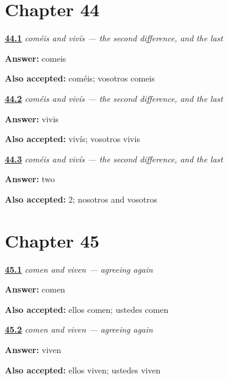 \section*{Chapter 44}

\noindent\begin{minipage}[t]{\linewidth}
\raggedright
\hyperlink{review-ES-C07-comeis-vivis-eat}{\textbf{44.1}} \emph{coméis and vivís — the second difference, and the last}\par
\small \textbf{Answer:} comeis\par
\footnotesize \textbf{Also accepted:} coméis; vosotros comeis
\end{minipage}\par\medskip

\noindent\begin{minipage}[t]{\linewidth}
\raggedright
\hyperlink{review-ES-C07-comeis-vivis-live}{\textbf{44.2}} \emph{coméis and vivís — the second difference, and the last}\par
\small \textbf{Answer:} vivis\par
\footnotesize \textbf{Also accepted:} vivís; vosotros vivis
\end{minipage}\par\medskip

\noindent\begin{minipage}[t]{\linewidth}
\raggedright
\hyperlink{review-ES-C07-comeis-vivis-count}{\textbf{44.3}} \emph{coméis and vivís — the second difference, and the last}\par
\small \textbf{Answer:} two\par
\footnotesize \textbf{Also accepted:} 2; nosotros and vosotros
\end{minipage}\par\medskip

\section*{Chapter 45}

\noindent\begin{minipage}[t]{\linewidth}
\raggedright
\hyperlink{review-ES-C07-comen-viven-eat}{\textbf{45.1}} \emph{comen and viven — agreeing again}\par
\small \textbf{Answer:} comen\par
\footnotesize \textbf{Also accepted:} ellos comen; ustedes comen
\end{minipage}\par\medskip

\noindent\begin{minipage}[t]{\linewidth}
\raggedright
\hyperlink{review-ES-C07-comen-viven-live}{\textbf{45.2}} \emph{comen and viven — agreeing again}\par
\small \textbf{Answer:} viven\par
\footnotesize \textbf{Also accepted:} ellos viven; ustedes viven
\end{minipage}\par\medskip

